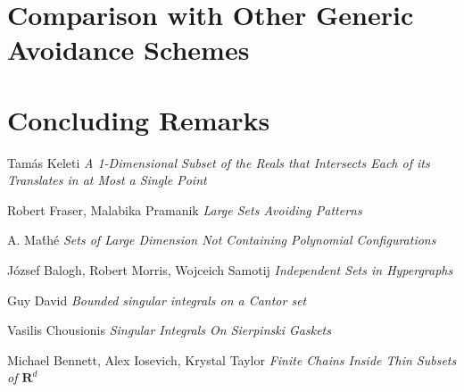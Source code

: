 \documentclass{article}
\theoremstyle{plain}
\theoremstyle{plain}
\begin{document}
\begin{multicols}{2}
\section{Comparison with Other Generic Avoidance Schemes}

\section{Concluding Remarks}

\begin{thebibliography}{9}

Tam\'{a}s Keleti
\textit{A 1-Dimensional Subset of the Reals that Intersects Each of its Translates in at Most a Single Point}

Robert Fraser, Malabika Pramanik
\textit{Large Sets Avoiding Patterns}

A. Ma\'{t}h\'{e}
\textit{Sets of Large Dimension Not Containing Polynomial Configurations}

J\'{o}zsef Balogh, Robert Morris, Wojceich Samotij
\textit{Independent Sets in Hypergraphs}

Guy David
\textit{Bounded singular integrals on a Cantor set}

Vasilis Chousionis
\textit{Singular Integrals On Sierpinski Gaskets}

Michael Bennett, Alex Iosevich, Krystal Taylor
\textit{Finite Chains Inside Thin Subsets of $\mathbf{R}^d$}

\end{thebibliography}

\end{multicols}
\end{document}
